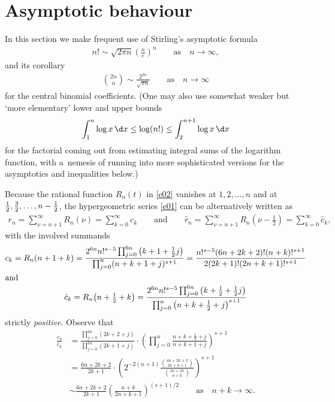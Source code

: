 \section{Asymptotic behaviour}\label{s3}

In this section we make frequent use of Stirling's asymptotic formula
\begin{gather*}
n!\sim\sqrt{2\pi n}\left(\frac ne\right)^n \qquad\text{as}\quad n\to\infty,
\end{gather*}
and its corollary
\begin{gather*}
\binom{2n}n\sim\frac{2^{2n}}{\sqrt{\pi n}} \qquad\text{as}\quad n\to\infty
\end{gather*}
for the central binomial coefficients. (One may also use somewhat weaker but `more elementary' lower and upper bounds
\begin{gather*}
\int_1^n\log x\,\d x\le\log(n!)\le\int_2^{n+1}\log x\,\d x
\end{gather*}
for the factorial coming out from estimating integral sums of the logarithm function, with a~nemesis of running into more sophisticated versions for the asymptotics and inequalities below.)

Because the rational function $R_n(t)$ in \eqref{e02} vanishes at $1,2,\dots,n$ and at $\frac12,\frac32,\dots,\allowbreak n-\nobreak\frac12$,
the hypergeometric series \eqref{e01} can be alternatively written as
\begin{gather*}
r_n=\sum_{\nu=n+1}^\infty R_n(\nu)=\sum_{k=0}^\infty c_k \qquad\text{and}\qquad
\hat r_n=\sum_{\nu=n+1}^\infty R_n(\nu-\tfrac12)=\sum_{k=0}^\infty\hat c_k,
\end{gather*}
with the involved summands
\begin{gather}
c_k=R_n(n+1+k)=\frac{2^{6n}n!^{s-5}\prod_{j=0}^{6n}\big(k+1+\frac12j\big)}{\prod_{j=0}^n(n+k+1+j)^{s+1}}
=\frac{n!^{s-5}(6n+2k+2)! (n+k)!^{s+1}}{2 (2k+1)! (2n+k+1)!^{s+1}}\label{e09}
\\ \intertext{and}
\hat c_k=R_n\big(n+\tfrac12+k\big)=\frac{2^{6n}n!^{s-5}\prod_{j=0}^{6n}\big(k+\frac12+\frac12j\big)} {\prod_{j=0}^n\big(n+k+\frac12+j\big)^{s+1}}\nonumber
\end{gather}
strictly \emph{positive}. Observe that
\begin{align}
\frac{c_k}{\hat c_k}
&=\frac{\prod_{j=0}^{6n}(2k+2+j)}{\prod_{j=0}^{6n}(2k+1+j)}
\cdot\left(\prod_{j=0}^n\frac{n+k+\frac12+j}{n+k+1+j}\right)^{s+1}\nonumber\\
&=\frac{6n+2k+2}{2k+1}\cdot\left(2^{-2(n+1)}\frac{\binom{4n+2k+2}{2n+k+1}}{\binom{2n+2k}{n+k}}\right)^{s+1}\nonumber\\
&\sim\frac{6n+2k+2}{2k+1}\left(\frac{n+k}{2n+k+1}\right)^{(s+1)/2} \qquad\text{as}\quad n+k\to\infty. \label{e10}
\end{align}

